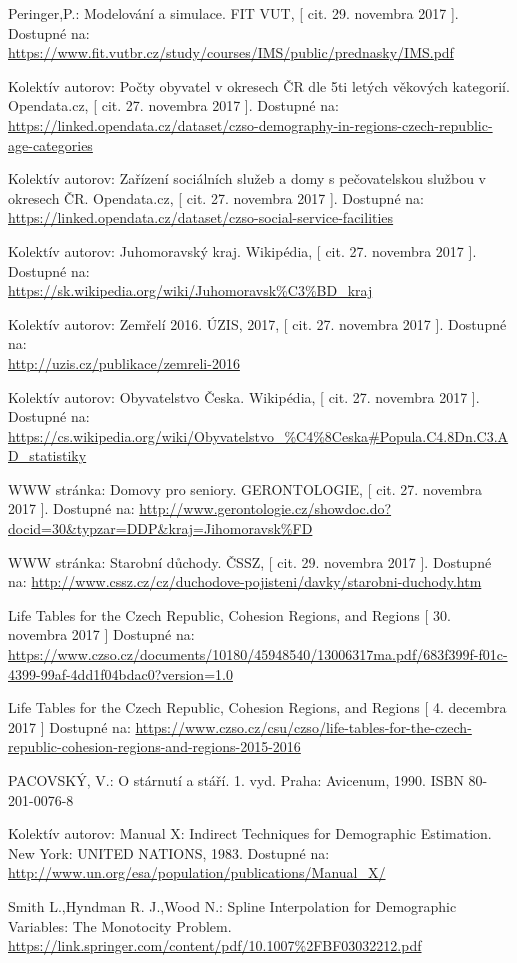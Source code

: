 \documentclass[a4paper, 11pt]{article}
\begin{document}
\renewcommand\refname{Odkazy}
\begin{thebibliography}{9}
 Peringer,P.: Modelování a simulace. FIT VUT, [ cit. 29. novembra 2017 ]. Dostupné na: \\\url{https://www.fit.vutbr.cz/study/courses/IMS/public/prednasky/IMS.pdf}

 Kolektív autorov: Počty obyvatel v okresech ČR dle 5ti letých věkových kategorií. Opendata.cz, [ cit. 27. novembra 2017 ]. Dostupné na: \\\url{https://linked.opendata.cz/dataset/czso-demography-in-regions-czech-republic-age-categories}

 Kolektív autorov: Zařízení sociálních služeb a domy s pečovatelskou službou v okresech ČR. Opendata.cz, [ cit. 27. novembra 2017 ]. Dostupné na: \\\url{https://linked.opendata.cz/dataset/czso-social-service-facilities}

 Kolektív autorov: Juhomoravský kraj. Wikipédia, [ cit. 27. novembra 2017 ]. Dostupné na: \\\url{https://sk.wikipedia.org/wiki/Juhomoravsk%C3%BD_kraj}

 Kolektív autorov: Zemřelí 2016. ÚZIS, 2017, [ cit. 27. novembra 2017 ]. Dostupné na:
\\\url{http://uzis.cz/publikace/zemreli-2016}

 Kolektív autorov: Obyvatelstvo Česka. Wikipédia, [ cit. 27. novembra 2017 ]. Dostupné na:\\\url{https://cs.wikipedia.org/wiki/Obyvatelstvo_%C4%8Ceska#Popula.C4.8Dn.C3.AD_statistiky}

 WWW stránka: Domovy pro seniory. GERONTOLOGIE, [ cit. 27. novembra 2017 ]. Dostupné na: 
\url{http://www.gerontologie.cz/showdoc.do?docid=30&typzar=DDP&kraj=Jihomoravsk%FD}

 WWW stránka: Starobní důchody. ČSSZ, [ cit. 29. novembra 2017 ]. Dostupné na: 
\url{http://www.cssz.cz/cz/duchodove-pojisteni/davky/starobni-duchody.htm}

 Life Tables for the Czech Republic, Cohesion Regions, and Regions [ 30. novembra 2017 ] Dostupné na: \url{https://www.czso.cz/documents/10180/45948540/13006317ma.pdf/683f399f-f01c-4399-99af-4dd1f04bdac0?version=1.0}

 Life Tables for the Czech Republic, Cohesion Regions, and Regions [ 4. decembra 2017 ] Dostupné na:
\url{https://www.czso.cz/csu/czso/life-tables-for-the-czech-republic-cohesion-regions-and-regions-2015-2016}

 PACOVSKÝ, V.: O stárnutí a stáří. 1. vyd. Praha: Avicenum, 1990. ISBN 80-201-0076-8

 Kolektív autorov: Manual X: Indirect Techniques for Demographic Estimation. New York: UNITED NATIONS, 1983. Dostupné na:
\url{http://www.un.org/esa/population/publications/Manual_X/}

 Smith L.,Hyndman R. J.,Wood N.: Spline Interpolation for Demographic Variables:
The Monotocity Problem. 
\url{https://link.springer.com/content/pdf/10.1007%2FBF03032212.pdf}
\end{thebibliography}
\end{document}
